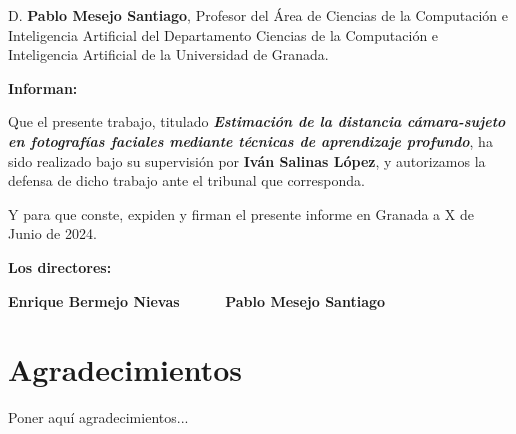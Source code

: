 D. \textbf{Pablo Mesejo Santiago}, Profesor del Área de Ciencias de la Computación e Inteligencia Artificial del Departamento Ciencias de la Computación e Inteligencia Artificial de la Universidad de Granada.


\vspace{0.5cm}

\textbf{Informan:}

\vspace{0.5cm}

Que el presente trabajo, titulado \textit{\textbf{Estimación de la distancia cámara-sujeto en fotografías faciales mediante técnicas de aprendizaje profundo}}, ha sido realizado bajo su supervisión por \textbf{Iván Salinas López}, y autorizamos la defensa de dicho trabajo ante el tribunal
que corresponda.

\vspace{0.5cm}

Y para que conste, expiden y firman el presente informe en Granada a X de Junio de 2024.

\vspace{1cm}

\textbf{Los directores:}

\vspace{5cm}

\noindent \textbf{Enrique Bermejo Nievas \ \ \ \ \ Pablo Mesejo Santiago}

\chapter*{Agradecimientos}
\thispagestyle{empty}

       \vspace{1cm}


Poner aquí agradecimientos...

